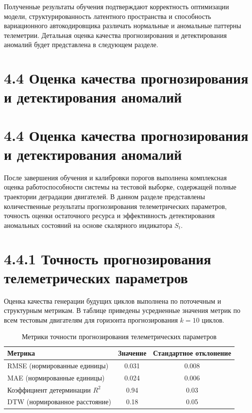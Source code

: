 \documentclass[14pt, a4paper, oneside]{extreport}
\begin{document}
Полученные результаты обучения подтверждают корректность оптимизации модели, структурированность латентного пространства и способность вариационного автокодировщика различать нормальные и аномальные паттерны телеметрии. Детальная оценка качества прогнозирования и детектирования аномалий будет представлена в следующем разделе.


\vspace{1em}
\section{4.4 Оценка качества прогнозирования и детектирования аномалий}
\vspace{1em}
\section{4.4 Оценка качества прогнозирования и детектирования аномалий}

После завершения обучения и калибровки порогов выполнена комплексная оценка работоспособности системы на тестовой выборке, содержащей полные траектории деградации двигателей. В данном разделе представлены количественные результаты прогнозирования телеметрических параметров, точность оценки остаточного ресурса и эффективность детектирования аномальных состояний на основе скалярного индикатора $S_t$.

\vspace{1em}
\section{4.4.1 Точность прогнозирования телеметрических параметров}
\vspace{1em}

Оценка качества генерации будущих циклов выполнена по поточечным и структурным метрикам. В таблице приведены усредненные значения метрик по всем тестовым двигателям для горизонта прогнозирования $k = 10$ циклов.

\begin{table}[htbp]
\centering
\caption{Метрики точности прогнозирования телеметрических параметров}
\label{tab:forecasting_metrics}
\begin{tabular}{lcc}
\hline
Метрика & Значение & Стандартное отклонение \\
\hline
RMSE (нормированные единицы) & 0.031 & 0.008 \\
MAE (нормированные единицы) & 0.024 & 0.006 \\
Коэффициент детерминации $R^2$ & 0.94 & 0.03 \\
DTW (нормированное расстояние) & 0.18 & 0.05 \\
\hline
\end{tabular}
\end{table}
\end{document}
